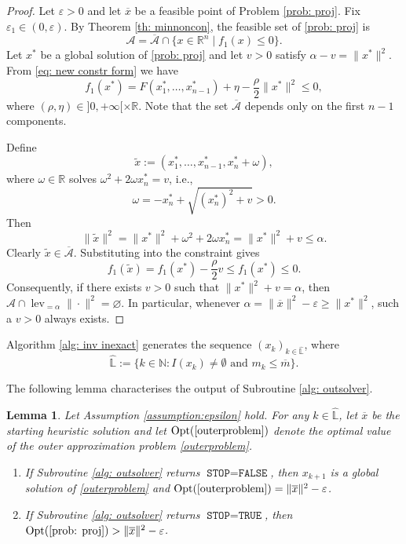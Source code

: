 \documentclass[12pt]{amsart}
\theoremstyle{plain}
\newtheorem{lemma}[theorem]{Lemma}
\theoremstyle{definition}
\begin{document}
\begin{proof}
Let \(\varepsilon > 0\) and let \(\overline{x}\) be a feasible point of Problem \eqref{prob: proj}. Fix \(\varepsilon_1 \in (0, \varepsilon)\). By Theorem \ref{th: minnoncon}, the feasible set of \eqref{prob: proj} is
\[
\mathcal{A} = \overline{\mathcal{A}} \cap \{ x \in \mathbb{R}^n \mid f_1(x) \le 0 \}.
\]
Let \(x^*\) be a global solution of \eqref{prob: proj} and let \(v > 0\) satisfy \(\alpha - v = \|x^*\|^2\). From \eqref{eq: new constr form} we have
\[
f_1(x^*) = F(x_1^*, \dots, x_{n-1}^*) + \eta - \frac{\rho}{2} \|x^*\|^2 \le 0,
\]
where \((\rho, \eta) \in ]0, +\infty[ \times \mathbb{R}\). Note that the set $\overline{\mathcal{A}}$ depends only on the first \(n-1\) components.

Define
\[
\tilde{x} := (x_1^*, \dots, x_{n-1}^*, x_n^* + \omega),
\]
where \(\omega \in \mathbb{R}\) solves \(\omega^2 + 2\omega x_n^* = v\), i.e.,
\[
\omega = -x_n^* + \sqrt{(x_n^*)^2 + v} > 0.
\]
Then
\[
\|\tilde{x}\|^2 = \|x^*\|^2 + \omega^2 + 2\omega x_n^* = \|x^*\|^2 + v \le \alpha.
\]
Clearly \(\tilde{x} \in \overline{\mathcal{A}}\). Substituting into the constraint gives
\[
f_1(\tilde{x}) = f_1(x^*) - \frac{\rho}{2} v \le f_1(x^*) \le 0.
\]
Consequently, if there exists \(v > 0\) such that \(\|x^*\|^2 + v = \alpha\), then \(\mathcal{A} \cap \operatorname{lev}_{=\alpha} \|\cdot\|^2 = \varnothing\). In particular, whenever \(\alpha = \|\overline{x}\|^2 - \varepsilon \ge \|x^*\|^2\), such a \(v > 0\) always exists.
\end{proof}

Algorithm \ref{alg: inv inexact} generates the sequence \((x_k)_{k \in \widehat{\mathbb{L}}}\), where
\[
\widehat{\mathbb{L}} := \{ k \in \mathbb{N} : I(x_k) \neq \emptyset \text{ and } m_k \le \overline{m} \}.
\]

The following lemma characterises the output of Subroutine \ref{alg: outsolver}.

\begin{lemma}
\label{lem: sub1 outcome}
Let Assumption \ref{assumption:epsilon} hold. For any \(k \in \widehat{\mathbb{L}}\), let \(\overline{x}\) be the starting heuristic solution and let \(\operatorname{Opt}(\eqref{outerproblem})\) denote the optimal value of the outer approximation problem \eqref{outerproblem}.
\begin{enumerate}
    \item If Subroutine \ref{alg: outsolver} returns \(\texttt{STOP} = \texttt{FALSE}\), then \(x_{k+1}\) is a global solution of \eqref{outerproblem} and \(\operatorname{Opt}(\eqref{outerproblem}) = \|\overline{x}\|^2 - \varepsilon\).
    \item If Subroutine \ref{alg: outsolver} returns \(\texttt{STOP} = \texttt{TRUE}\), then \(\operatorname{Opt}(\eqref{prob: proj}) > \|\overline{x}\|^2 - \varepsilon\).
\end{enumerate}
\end{lemma}
\end{document}
